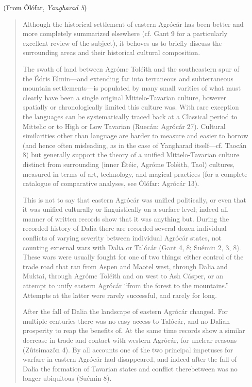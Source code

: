 \documentclass{article}
\begin{document}
(From Ólófar, \textit{Yangharad 5})

\color{black}
\begin{quotation}

Although the historical settlement of eastern Agrócár has been better and more completely summarized elsewhere (cf. Gant 9 for a particularly excellent review of the subject), it behoves us to briefly discuss the surrounding areas and their historical cultural composition.

The swath of land between Agróme Toléith and the southeastern spur of the Édris Elmin—and extending far into terraneous and subterraneous mountain settlements—is populated by many small varities of what must clearly have been a single original Mittelo-Tavarian culture, however spatially or chronologically limited this culture was. With rare exception the languages can be systematically traced back at a Classical period to Mittelic or to High or Low Tavarian (Ruecán: Agrócár 27). Cultural similarities other than language are harder to measure and easier to borrow (and hence often misleading, as in the case of Yangharad itself—cf. Taocán 8) but generally support the theory of a unified Mittelo-Tavarian culture distinct from surrounding (inner Étéic, Agróme Toléith, Taol) cultures, measured in terms of art, technology, and magical practices (for a complete catalogue of comparative analyses, see Ólófar: Agrócár 13).

This is not to say that eastern Agrócár was unified politically, or even that it was unified culturally or linguistically on a surface level; indeed all manner of written records show that it was anything but. During the recorded history of Dalia there are recorded several dozen individual conflicts of varying severity between individual Agrócár states, not counting external wars with Dalia or Talócár (Gant 4, 8; Suémin 2, 3, 8). These wars were usually fought for one of two things: either control of the trade road that ran from Aspen and Maotel west, through Dalia and Muktai, through Agróme Toléith and on west to Ash Cásper, or an attempt to unify eastern Agrócár ``from the forest to the mountains.'' Attempts at the latter were rarely successful, and rarely for long.

After the fall of Dalia the landscape of eastern Agrócár changed. For multiple centuries there was no easy access to Talócár, and no Dalian prosperity to reap the benefits of. At the same time records show a similar decrease in trade and contact with western Agrócár, for unclear reasons (Zûtsimazôn 4). By all accounts one of the two principal impetuses for warfare in eastern Agrócár had disappeared, and indeed after the fall of Dalia the formation of Tavarian states and conflict therebetween was no longer ubiquitous (Suémin 8).


\end{quotation}
\end{document}
